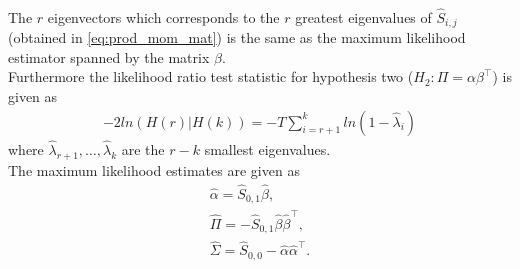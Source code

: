 \begin{thm}{\phantom}\\
    The $r$ eigenvectors which corresponds to the $r$ greatest eigenvalues of $\hat{S}_{i,j}$ (obtained in \eqref{eq:prod_mom_mat}) is the same as the maximum likelihood estimator spanned by the matrix $\beta$.\\
    Furthermore the likelihood ratio test statistic for hypothesis two ($H_2:\Pi=\alpha\beta^{\top}$) is given as 
    \begin{align}\label{eq:lrmax_coint_r}
        -2ln(H(r)|H(k))=-T\sum_{i=r+1}^k ln(1-\hat{\lambda}_i)
    \end{align}
    where $\hat{\lambda}_{r+1},\ldots,\hat{\lambda}_{k}$ are the $r-k$ smallest eigenvalues.\\
    The maximum likelihood estimates are given as
    \begin{align*}
        \hat{\alpha}=\hat{S}_{0,1}\hat{\beta},\\
        \hat{\Pi}=-\hat{S}_{0,1}\hat{\beta}\hat{\beta}^\top,\\
        \hat{\Sigma}=\hat{S}_{0,0}-\hat{\alpha}\hat{\alpha}^\top.
    \end{align*}
\end{thm}
